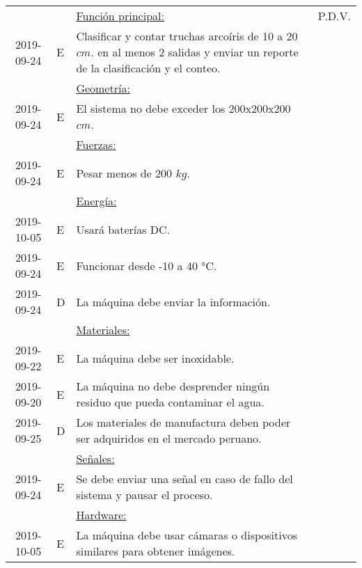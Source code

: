 \begin{savenotes}
\begin{longtable}{|c|p{0.6cm}|p{10cm}|c|}
		
					&    & \underline{Función principal:}																										& P.D.V. 	\\
		2019-09-24  & E  & Clasificar y contar truchas arcoíris de 10 a 20 $ cm $. en al menos 2 salidas y enviar un reporte de la clasificación y el conteo.   & \multicolumn{1}{l|}{}	\\ 
					&    & \underline{Geometría:}																												& \multicolumn{1}{l|}{}	\\
		2019-09-24  & E  & El sistema no debe exceder los 200x200x200 $ cm $.																					& \multicolumn{1}{l|}{}	\\ 
					&    & \underline{Fuerzas:}																													& \multicolumn{1}{l|}{}	\\
		2019-09-24  & E  & Pesar menos de 200 $ kg $.																											& \multicolumn{1}{l|}{}	\\ 
					&    & \underline{Energía:}																													& \multicolumn{1}{l|}{}	\\
		2019-10-05  & E  & Usará baterías DC.																													& \multicolumn{1}{l|}{}	\\ 	
		2019-09-24  & E  & Funcionar desde -10 a 40 °C.																											& \multicolumn{1}{l|}{}	\\ 	
		2019-09-24  & D  & La máquina debe enviar la información.																								& \multicolumn{1}{l|}{}	\\ 	
					&    & \underline{Materiales:}																												& \multicolumn{1}{l|}{}	\\
		2019-09-22  & E  & La máquina debe ser inoxidable.																										& \multicolumn{1}{l|}{}	\\ 	
		2019-09-20  & E  & La máquina no debe desprender ningún residuo que pueda contaminar el agua.															& \multicolumn{1}{l|}{}	\\ 	
		2019-09-25  & D  & Los materiales de manufactura deben poder ser adquiridos en el mercado peruano.														& \multicolumn{1}{l|}{}	\\ 			
					&    & \underline{Señales:}																													& \multicolumn{1}{l|}{}	\\
		2019-09-24  & E  & Se debe enviar una señal en caso de fallo del sistema y pausar el proceso.															& \multicolumn{1}{l|}{}	\\ 	
					&    & \underline{Hardware:}																												& \multicolumn{1}{l|}{}	\\
		2019-10-05  & E  & La máquina debe usar cámaras o dispositivos similares para obtener imágenes.															& \multicolumn{1}{l|}{}	\\ 		

\end{longtable}
\end{savenotes}
